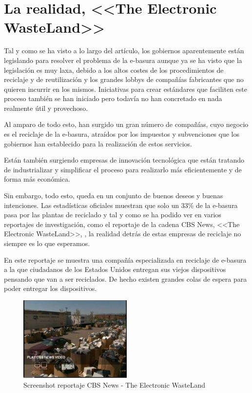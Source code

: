 \section{La realidad, <<The Electronic WasteLand>>}

Tal y como se ha visto a lo largo del artículo, los gobiernos aparentemente están legislando para resolver el problema de la e-basura aunque ya se ha visto que la legislación es muy laxa, debido a los altos costes de los procedimientos de reciclaje y de reutilización y los grandes lobbys de compañías fabricantes que no quieren incurrir en los mismos. Iniciativas para crear estándares que faciliten este proceso también se han iniciado pero todavía no han concretado en nada realmente útil y provechoso.

Al amparo de todo esto, han surgido un gran número de compañías, cuyo negocio es el reciclaje de la e-basura, atraídos por los impuestos y subvenciones que los gobiernos han establecido para la realización de estos servicios. 

Están también surgiendo empresas de innovación tecnológica que están tratando de industrializar y simplificar el proceso para realizarlo más eficientemente y de forma más económica.

Sin embargo, todo esto, queda en un conjunto de buenos deseos y buenas intenciones. Las estadísticas oficiales muestran que solo un 33\% de la e-basura pasa por las plantas de reciclado y tal y como se ha podido ver en varios reportajes de investigación, como el reportaje de la cadena CBS News, <<The Electronic WasteLand>>, \cite{wasteland}, la realidad detrás de estas empresas de reciclaje no siempre es lo que esperamos.

En este reportaje se muestra una compañía especializada en reciclaje de e-basura a la que ciudadanos de los Estados Unidos entregan sus viejos dispositivos pensando que van a ser reciclados. De hecho existen grandes colas de espera para poder entregar los dispositivos.

\begin{figure}[H]
\begin{center}
\includegraphics[width=0.5\textwidth]{img/screen1}
\caption{Screenshot reportaje CBS News - The Electronic WasteLand}
\end{center}
\end{figure}

